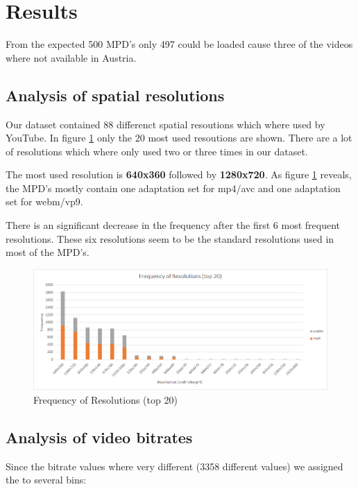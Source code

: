 \documentclass[paper=a4, fontsize=11pt]{scrartcl} %
\numberwithin{equation}{section} %
\numberwithin{figure}{section} %
\numberwithin{table}{section} %
\begin{document}
\section{Results}\label{results}

From the expected 500 MPD's only 497 could be loaded cause three of the
videos where not available in Austria.

\subsection{Analysis of spatial
resolutions}\label{analysis-of-spatial-resolutions}

Our dataset contained 88 differenct spatial resoutions which where used
by YouTube. In figure \ref{fig:1} only the 20 most used resoutions are shown.
There are a lot of resolutions which where only used two or three times
in our dataset.

The most used resolution is \textbf{640x360} followed by
\textbf{1280x720}. As figure \ref{fig:1} reveals, the MPD's mostly contain one
adaptation set for mp4/avc and one adaptation set for webm/vp9.

There is an significant decrease in the frequency after the first 6 most
frequent resolutions. These six resolutions seem to be the standard
resolutions used in most of the MPD's.

\begin{figure}[htbp]
\centering
\includegraphics[width=\textwidth]{./frequency-resolution.png}
\caption{Frequency of Resolutions (top 20)}
\label{fig:1}
\end{figure}

\subsection{Analysis of video
bitrates}\label{analysis-of-video-bitrates}

Since the bitrate values where very different (3358 different values) we
assigned the to several bins:
\end{document}
